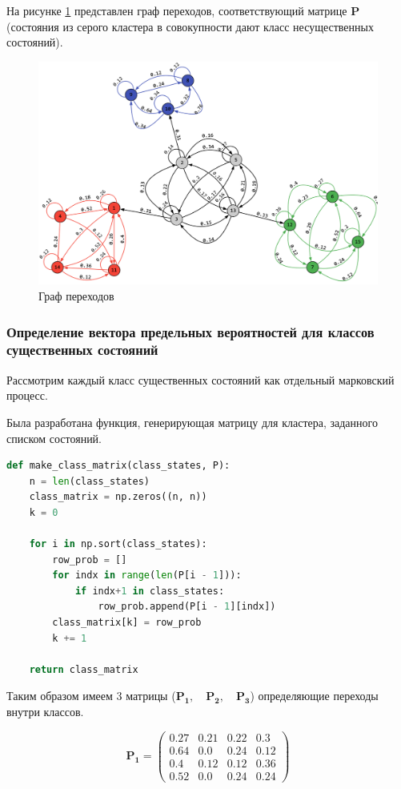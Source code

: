 На рисунке \ref{graph} представлен граф переходов, соответствующий матрице $\mathbf{P}$ (состояния из серого кластера в совокупности дают класс несущественных состояний).
\begin{figure}[H]
\centerline{\includegraphics[width=0.7\columnwidth]{Images/1.png}}
\caption{Граф переходов}
\label{graph}
\end{figure}

\subsubsection{Определение вектора предельных вероятностей для классов существенных состояний}

Рассмотрим каждый класс существенных состояний как отдельный марковский процесс.

Была разработана функция, генерирующая матрицу для кластера, заданного списком состояний.

\begin{lstlisting}[language=python, label=prog,caption={\textit{Генерация стахастической матрицы переходов внутри кластера}}]
def make_class_matrix(class_states, P):
    n = len(class_states)
    class_matrix = np.zeros((n, n))
    k = 0

    for i in np.sort(class_states):
        row_prob = []
        for indx in range(len(P[i - 1])):
            if indx+1 in class_states:
                row_prob.append(P[i - 1][indx])
        class_matrix[k] = row_prob
        k += 1

    return class_matrix
\end{lstlisting}

Таким образом имеем 3 матрицы ($\mathbf{P_{1}}, \quad \mathbf{P_{2}}, \quad \mathbf{P_{3}}$) определяющие переходы внутри классов.

$$\mathbf{P_{1}}=
\begin{pmatrix}
    0.27 & 0.21 & 0.22 & 0.3 \\
0.64 & 0.0 & 0.24 & 0.12 \\
0.4 & 0.12 & 0.12 & 0.36 \\
0.52 & 0.0 & 0.24 & 0.24 
\end{pmatrix}$$

